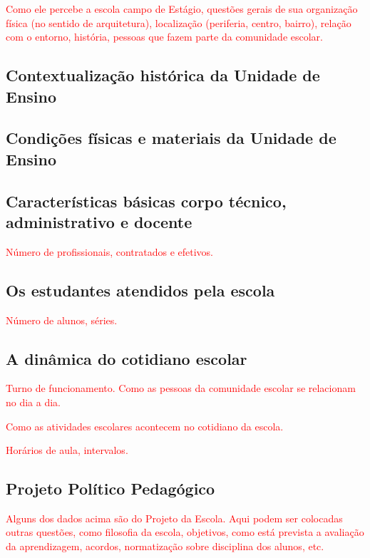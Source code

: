 \documentclass[12pt,a4paper]{article}
\begin{document}
        \textcolor{red}{Como ele percebe a escola campo de Estágio, questões gerais de sua organização física (no sentido de arquitetura), localização (periferia, centro, bairro), relação com o entorno, história, pessoas que fazem parte da comunidade escolar.}

    \subsection{Contextualização histórica da Unidade de Ensino}




    \subsection{Condições físicas e materiais da Unidade de Ensino}



    \subsection{Características básicas corpo técnico, administrativo e docente}

        \textcolor{red}{Número de profissionais, contratados e efetivos.}

    \subsection{Os estudantes atendidos pela escola}

        \textcolor{red}{Número de alunos, séries.}

    \subsection{A dinâmica do cotidiano escolar}

        \textcolor{red}{Turno de funcionamento. Como as pessoas da comunidade escolar se relacionam no dia a dia.}
        
        \textcolor{red}{Como as atividades escolares acontecem no cotidiano da escola.}
        
        \textcolor{red}{Horários de aula, intervalos.}

    \subsection{Projeto Político Pedagógico}

        \textcolor{red}{Alguns dos dados acima são do Projeto da Escola. Aqui podem ser colocadas outras questões, como filosofia da escola, objetivos, como está prevista a avaliação da aprendizagem, acordos, normatização sobre disciplina dos alunos, etc.}
\end{document}
